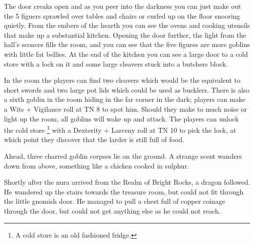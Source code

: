 \begin{multicols}{2}
\begin{boxtext}

The door creaks open and as you peer into the darkness you can just make out the 5 figuers sprawled over tables and chairs or curled up on the floor snooring quietly. 
From the embers of the hearth you can see the ovens and cooking utensils that make up a substantial kitchen. 
Opening the door further, the light from the hall's sconces fills the room, and you can see that the five figures are more goblins with little fat bellies.
At the end of the kitchen you can see a large door to a cold store with a lock on it and some large cleavers stuck into a butchers block.

\end{boxtext}

\noindent
In the room the players can find two cleavers which would be the equivalent to short swords and two large pot lids which could be used as bucklers.
There is also a sixth goblin in the room hiding in the far corner in the dark; players can make a Wits + Vigilance roll at TN 8 to spot him.
Should they make to much noise or light up the room, all goblins will wake up and attack.
The players can unlock the cold store
\footnote{A cold store is an old fashioned fridge.}%
with a Dexterity + Larceny roll at TN 10 to pick the lock, at which point they discover that the larder is still full of food.






\begin{boxtext}

	Ahead, three charred goblin corpses lie on the ground.
	A strange scent wanders down from above, something like a chicken cooked in sulphur.

\end{boxtext}


\begin{exampletext}

	Shortly after the nura arrived from the Realm of Bright Rocks, a dragon followed.
	He wandered up the stairs towards the treasure room, but could not fit through the little gnomish door.
	He managed to pull a chest full of copper coinage through the door, but could not get anything else as he could not reach.


\end{exampletext}
\end{multicols}
